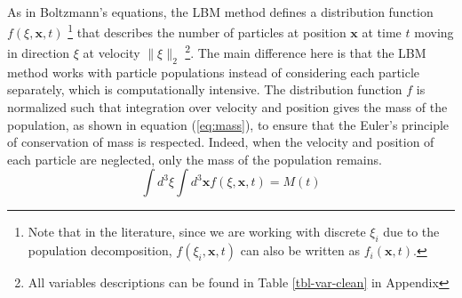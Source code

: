 \documentclass{article}
\begin{document}
\paragraph{}{
As in Boltzmann's equations, the LBM method defines a distribution function $f(\xi, \mathbf{x}, t)$ \footnote{Note that in the literature, since we are working with discrete $\xi_i$ due to the population decomposition, $f(\xi_i, \mathbf{x}, t)$ can also be written as $f_i(\mathbf{x}, t)$.} that describes the number of particles at position $\mathbf{x}$ at time $t$ moving in direction $\xi$ at velocity $\lVert \xi \rVert_{2}$ \footnote{All variables descriptions can be found in Table \ref{tbl-var-clean} in Appendix}.
The main difference here is that the LBM method works with particle populations instead of considering each particle separately, which is computationally intensive.
The distribution function $f$ is normalized such that integration over velocity and position gives the mass of the population, as shown in equation (\ref{eq:mass}), to ensure that the Euler's principle of conservation of mass is respected.
Indeed, when the velocity and position of each particle are neglected, only the mass of the population remains.
\begin{equation}
    \label{eq:mass}
    \int d^3 \xi \int d^3 \mathbf{x} f(\xi, \mathbf{x}, t) = M(t)
\end{equation}

}
\end{document}
